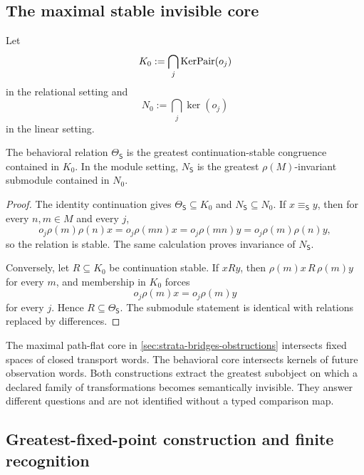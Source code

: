 \subsection{The maximal stable invisible core}
\label{subsec:block17-stable-core}

Let
\[
 K_0:=\bigcap_j\operatorname{KerPair}(o_j)
\]
in the relational setting and
\[
 N_0:=\bigcap_j\ker(o_j)
\]
in the linear setting.

\begin{theorem}
\label{thm:block17-behavioral-core}
The behavioral relation \(\Theta_{\mathsf S}\) is the greatest continuation-stable congruence contained in \(K_0\).  In the module setting, \(N_{\mathsf S}\) is the greatest \(\rho(M)\)-invariant submodule contained in \(N_0\).
\end{theorem}

\begin{proof}
The identity continuation gives \(\Theta_{\mathsf S}\subseteq K_0\) and \(N_{\mathsf S}\subseteq N_0\).  If \(x\equiv_{\mathsf S}y\), then for every \(n,m\in M\) and every \(j\),
\[
 o_j\rho(m)\rho(n)x
 =o_j\rho(mn)x
 =o_j\rho(mn)y
 =o_j\rho(m)\rho(n)y,
\]
so the relation is stable.  The same calculation proves invariance of \(N_{\mathsf S}\).

Conversely, let \(R\subseteq K_0\) be continuation stable.  If \(xRy\), then \(\rho(m)x\,R\,\rho(m)y\) for every \(m\), and membership in \(K_0\) forces
\[
 o_j\rho(m)x=o_j\rho(m)y
\]
for every \(j\).  Hence \(R\subseteq\Theta_{\mathsf S}\).  The submodule statement is identical with relations replaced by differences.
\end{proof}

\begin{remark}
The maximal path-flat core in \cref{sec:strata-bridges-obstructions} intersects fixed spaces of closed transport words.  The behavioral core intersects kernels of future observation words.  Both constructions extract the greatest subobject on which a declared family of transformations becomes semantically invisible.  They answer different questions and are not identified without a typed comparison map.
\end{remark}

\subsection{Greatest-fixed-point construction and finite recognition}
\label{subsec:block17-fixed-point}

